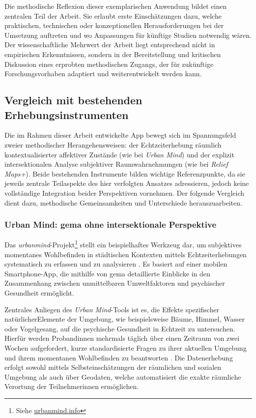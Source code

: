 Die methodische Reflexion dieser exemplarischen Anwendung bildet einen zentralen Teil der Arbeit. Sie erlaubt erste Einschätzungen dazu, welche praktischen, technischen oder konzeptionellen Herausforderungen bei der Umsetzung auftreten und wo Anpassungen für künftige Studien notwendig wären. Der wissenschaftliche Mehrwert der Arbeit liegt entsprechend nicht in empirischen Erkenntnissen, sondern in der Bereitstellung und kritischen Diskussion eines erprobten methodischen Zugangs, der für zukünftige Forschungsvorhaben adaptiert und weiterentwickelt werden kann.


\subsection{Vergleich mit bestehenden Erhebungsinstrumenten}

Die im Rahmen dieser Arbeit entwickelte App bewegt sich im Spannungsfeld zweier methodischer Herangehensweisen: der Echtzeiterhebung räumlich kontextualisierter affektiver Zustände (wie bei \textit{Urban Mind}) und der explizit intersektionalen Analyse subjektiver Raumwahrnehmungen (wie bei \textit{Relief Maps+}). Beide bestehenden Instrumente bilden wichtige Referenzpunkte, da sie jeweils zentrale Teilaspekte des hier verfolgten Ansatzes adressieren, jedoch keine vollständige Integration beider Perspektiven vornehmen. Der folgende Vergleich dient dazu, methodische Gemeinsamkeiten und Unterschiede herauszuarbeiten.

\subsubsection*{Urban Mind: \acrshort{gema} ohne intersektionale Perspektive}

Das \textit{\gls{urbanmind}}-Projekt\footnote{Siehe \href{https://www.urbanmind.info/}{urbanmind.info}} stellt ein beispielhaftes Werkzeug dar, um subjektives momentanes Wohlbefinden in städtischen Kontexten mittels Echtzeiterhebungen systematisch zu erfassen und zu analysieren \parencite{bakolisUrbanMindUsing2018}. Es basiert auf einer mobilen Smartphone-App, die mithilfe von \acrshort{gema} detaillierte Einblicke in den Zusammenhang zwischen unmittelbaren Umweltfaktoren und psychischer Gesundheit ermöglicht.

Zentrales Anliegen des \textit{Urban Mind}-Tools ist es, die Effekte spezifischer natürlicherElemente der Umgebung, wie beispielsweise Bäume, Himmel, Wasser oder Vogelgesang, auf die psychische Gesundheit in Echtzeit zu untersuchen. Hierfür werden Proband\genderstern innen mehrmals täglich über einen Zeitraum von zwei Wochen aufgefordert, kurze standardisierte Fragen zu ihrer aktuellen Umgebung und ihrem momentanen Wohlbefinden zu beantworten \parencite{bakolisUrbanMindUsing2018}. Die Datenerhebung erfolgt sowohl mittels Selbsteinschätzungen der räumlichen und sozialen Umgebung als auch über Geodaten, welche automatisiert die exakte räumliche Verortung der Teilnehmer\genderstern innen ermöglichen.

